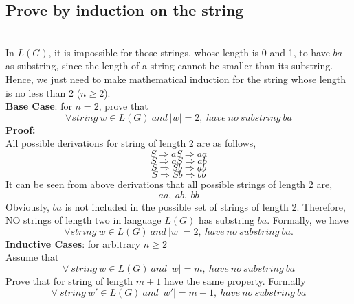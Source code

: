 \documentclass[11pt,a4paper]{article}
\newcommand{\htab}{\hspace*{0.63cm}}
\newcommand{\pg}{\\[0.3cm]}
\begin{document}
 \subsection{Prove by induction on the string}
\htab {Prove by induction on the string length that no string in $L(G)$ has ba as a substring.} \pg
\htab In $L(G)$, it is impossible for those strings, whose length is 0 and 1, to have $ba$ as substring, since the length of a string cannot be smaller than its substring. Hence, we just need to make mathematical induction for the string whose length is no less than 2 ($n \geq 2$). \\[0.1cm]
\htab \textbf{Base Case}: for $n = 2$, prove that 
    $$\forall string\ w \in L(G)\ and\ |w| = 2,\ have\ no\ substring\ ba$$ 
\htab \textbf{Proof:}\\
\htab All possible derivations for string of length 2 are as follows,
    \begin{equation}  \label{S1}
        S \Rightarrow aS \Rightarrow aa 
    \end{equation}
    \begin{equation} \label{S2}
        S \Rightarrow aS \Rightarrow ab
    \end{equation}
    \begin{equation} \label{S3}
        S \Rightarrow Sb \Rightarrow ab
    \end{equation}
    \begin{equation} \label{S4}
        S \Rightarrow Sb \Rightarrow bb
    \end{equation}
\htab It can be seen from above derivations that all possible strings of length 2 are,
    $$ aa,\ ab,\ bb $$
\htab Obviously, $ba$ is not included in the possible set of strings of length 2. Therefore, NO strings of length two in language $L(G)$ has substring $ba$. Formally, we have  
    \begin{equation}
         \forall string\ w \in L(G)\ and\ |w| = 2,\ have\ no\ substring\ ba.
    \end{equation}
\htab \textbf{Inductive Cases}: for arbitrary $n\geq 2$ \\
\htab Assume that 
    \begin{equation} \label{1:precondition}
         \forall \ string\ w\in L(G)\ and\ |w| = m,\ have\ no \ substring\ ba
    \end{equation}
\htab Prove that for string of length $m+1$ have the same property. Formally
    \begin{equation} \label{1:postcondition}
         \forall \ string\ w' \in L(G)\ and\ |w'| = m+1,\ have \ no \ substring\ ba
    \end{equation}
\end{document}
